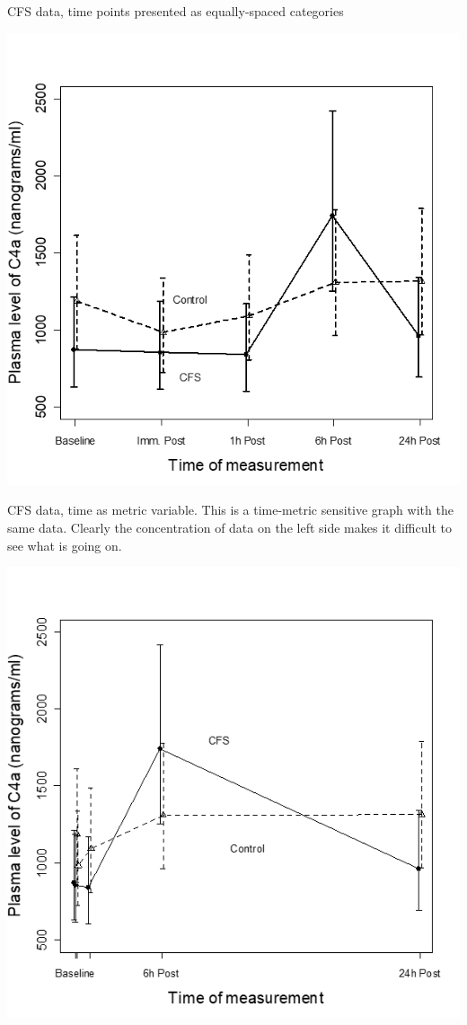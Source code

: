 \documentclass[
  9pt,
  ignorenonframetext,
]{beamer}
\begin{document}
\begin{frame}{CFS data, time points presented as equally-spaced
categories}
\protect\hypertarget{cfs-data-time-points-presented-as-equally-spaced-categories}{}
\tiny

\begin{center}\includegraphics[width=0.6\linewidth]{figs_L2/L2-f13} \end{center}

\tiny
\end{frame}

\begin{frame}{}
\protect\hypertarget{section-9}{}
CFS data, time as metric variable. This is a time-metric sensitive graph
with the same data. Clearly the concentration of data on the left side
makes it difficult to see what is going on.

\tiny

\begin{center}\includegraphics[width=0.6\linewidth]{figs_L2/L2-f14} \end{center}

\tiny
\end{frame}
\end{document}
